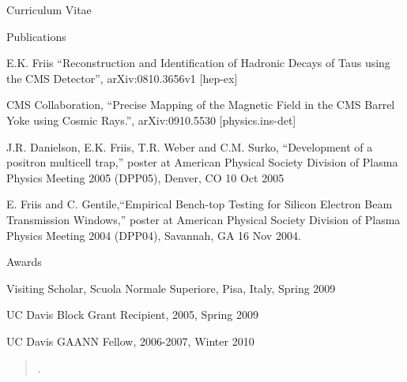 \documentclass[12pt]{amsart}
\begin{document}
\begin{cv}{Curriculum Vitae}
\begin{cvlist}{Publications}
\item
   E.K. Friis ``Reconstruction and Identification of Hadronic Decays of Taus using the CMS Detector'', arXiv:0810.3656v1 [hep-ex]
\item
   CMS Collaboration, ``Precise Mapping of the Magnetic Field in the CMS Barrel Yoke using Cosmic Rays.'', arXiv:0910.5530 [physics.ins-det]
\item 

\item
 J.R. Danielson, E.K. Friis, T.R. Weber and C.M. Surko, ``Development of a positron multicell trap,'' poster at American Physical Society Division of Plasma Physics Meeting 2005 (DPP05), Denver, CO 10 Oct 2005
\item
E. Friis and C. Gentile,``Empirical Bench-top Testing for Silicon Electron Beam Transmission Windows,'' poster at American Physical Society Division of Plasma Physics Meeting 2004 
(DPP04), Savannah, GA 16 Nov 2004. 
\end{cvlist}

\nocite{*}

\begin{cvlist}{Awards}
\item Visiting Scholar, Scuola Normale Superiore, Pisa, Italy, Spring 2009
\item UC Davis Block Grant Recipient, 2005, Spring 2009
\item UC Davis GAANN Fellow, 2006-2007, Winter 2010 
\end{cvlist}

\end{cv}

\begin{verse} 
   .
\end{verse}

 
\end{document}
